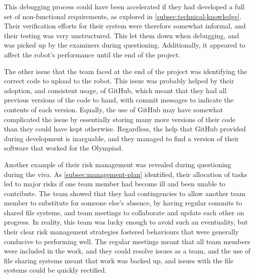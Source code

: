     This debugging process could have been accelerated if they had developed a full set of non-functional requirements, as explored in \autoref{subsec:technical-knowledge}.
    Their verification efforts for their system were therefore somewhat informal, and their testing was very unstructured.
    This let them down when debugging, and was picked up by the examiners during questioning.
    Additionally, it appeared to affect the robot's performance until the end of the project.

    The other issue that the team faced at the end of the project was identifying the correct code to upload to the robot.
    This issue was probably helped by their adoption, and consistent usage, of GitHub, which meant that they had all previous versions of the code to hand, with commit messages to indicate the contents of each version.
    Equally, the use of GitHub may have somewhat complicated the issue by essentially storing many more versions of their code than they could have kept otherwise.
    Regardless, the help that GitHub provided during development is inarguable, and they managed to find a version of their software that worked for the Olympiad.

    Another example of their risk management was revealed during questioning during the viva.
    As \autoref{subsec:management-plan} identified, their allocation of tasks led to major risks if one team member had become ill and been unable to contribute.
    The team showed that they had contingencies to allow another team member to substitute for someone else's absence, by having regular commits to shared file systems, and team meetings to collaborate and update each other on progress.
    In reality, this team was lucky enough to avoid such an eventuality, but their clear risk management strategies fostered behaviours that were generally conducive to performing well.
    The regular meetings meant that all team members were included in the work, and they could resolve issues as a team, and the use of file sharing systems meant that work was backed up, and issues with the file systems could be quickly rectified.


